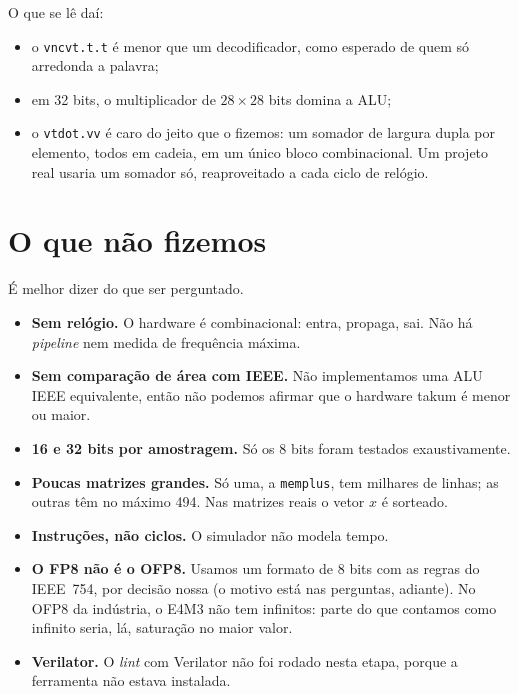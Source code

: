 \documentclass[11pt,a4paper]{article}
\newcommand{\code}[1]{\texttt{#1}}
\begin{document}
O que se lê daí:
\begin{itemize}[nosep]
  \item o \code{vncvt.t.t} é menor que um decodificador, como esperado de quem só arredonda a palavra;
  \item em 32 bits, o multiplicador de $28\times28$ bits domina a ALU;
  \item o \code{vtdot.vv} é caro do jeito que o fizemos: um somador de largura dupla por elemento, todos
        em cadeia, em um único bloco combinacional. Um projeto real usaria um somador só, reaproveitado a
        cada ciclo de relógio.
\end{itemize}

\section{O que não fizemos}

É melhor dizer do que ser perguntado.

\begin{itemize}
  \item \textbf{Sem relógio.} O hardware é combinacional: entra, propaga, sai. Não há \emph{pipeline} nem
        medida de frequência máxima.
  \item \textbf{Sem comparação de área com IEEE.} Não implementamos uma ALU IEEE equivalente, então não
        podemos afirmar que o hardware takum é menor ou maior.
  \item \textbf{16 e 32 bits por amostragem.} Só os 8 bits foram testados exaustivamente.
  \item \textbf{Poucas matrizes grandes.} Só uma, a \code{memplus}, tem milhares de linhas; as outras
        têm no máximo 494. Nas matrizes reais o vetor $x$ é sorteado.
  \item \textbf{Instruções, não ciclos.} O simulador não modela tempo.
  \item \textbf{O FP8 não é o OFP8.} Usamos um formato de 8 bits com as regras do IEEE~754, por decisão
        nossa (o motivo está nas perguntas, adiante). No OFP8 da indústria, o E4M3 não tem infinitos:
        parte do que contamos como infinito seria, lá, saturação no maior valor.
  \item \textbf{Verilator.} O \emph{lint} com Verilator não foi rodado nesta etapa, porque a ferramenta
        não estava instalada.
\end{itemize}

\end{document}
